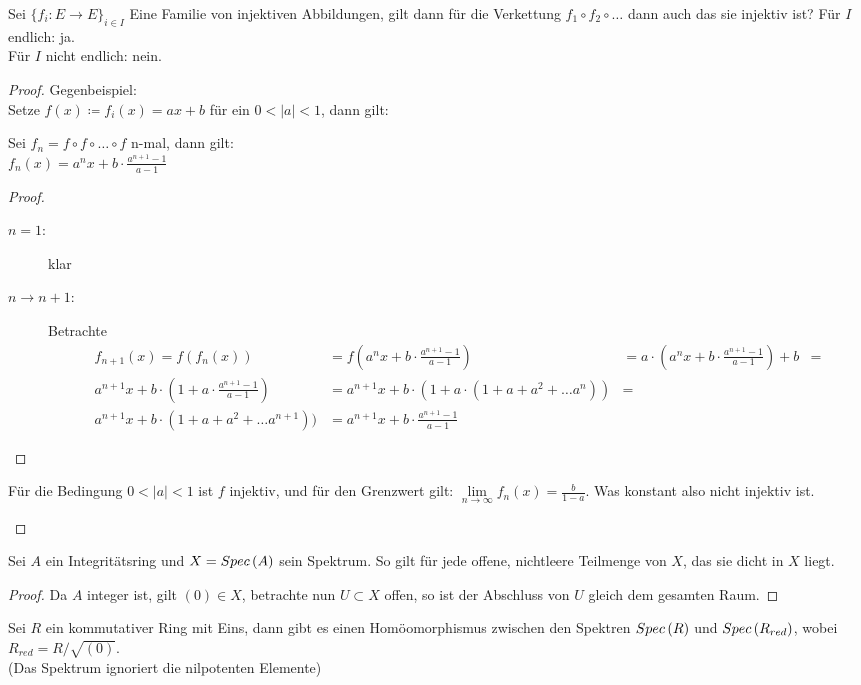 \documentclass[ngerman, parskip=half, titlepage=false]{scrartcl}
\begin{document}
\begin{Auf}
  Sei $\{ f_i : E \rightarrow E \}_{i \in I}$ Eine Familie von
  injektiven Abbildungen, gilt dann für die Verkettung
  $ f_1 \circ f_2 \circ \ldots$ dann auch das sie injektiv ist?
  Für $I$ endlich: ja.\\
  Für $I$ nicht endlich: nein.
  \begin{proof}
    Gegenbeispiel:\\ Setze $f(x) \coloneqq f_i (x) = ax+b$ für ein
    $0 < |a| < 1$, dann gilt:
    \begin{Beh}
      Sei $f_n = f \circ f \circ \ldots \circ f$ n-mal, dann gilt:\\
      $f_n(x) = a^n x + b \cdot \frac{a^{n+1} -1}{a-1}$
      \begin{proof}
        \begin{description}
        \item[$n=1$:] klar
        \item[$n \rightarrow n+1$:] Betrachte\\
          \begin{align*}
            f_{n+1}(x) = f(f_n(x)) 
          &= 
            f(a^n x + b \cdot \frac{a^{n+1}-1}{a-1}) 
          &= 
            a \cdot \left( a^n x + b \cdot \frac{a^{n+1}-1}{a-1} \right) + b        
          &= \\
            a^{n+1} x + b \cdot ( 1 + a \cdot \frac{a^{n+1}-1}{a-1})
          &= 
            a^{n+1} x + b \cdot (1 + a \cdot (1 + a + a^2 + \ldots a^{n}))
          &= \\
            a^{n+1} x + b \cdot (1  + a + a^2 + \ldots a^{n+1}))
          &= 
            a^{n+1} x + b \cdot \frac{a^{n+1}-1}{a-1}
          \end{align*}
        \end{description}
        \end{proof}
        Für die Bedingung $0 < |a| < 1$ ist $f$ injektiv, und für den
        Grenzwert gilt: $\lim\limits_{n \rightarrow \infty} f_n(x) = \frac{b}{1-a}$.
        Was konstant also nicht injektiv ist.
    \end{Beh}
  \end{proof}
\end{Auf}

\begin{Beh}
  Sei $A$ ein Integritätsring und $X = Spec \left( A \right)$ sein Spektrum. So gilt für jede
  offene, nichtleere Teilmenge von $X$, das sie dicht in $X$ liegt.
  \begin{proof}
    Da $A$ integer ist, gilt $(0) \in X$, betrachte nun $U \subset X$ offen, so 
    ist der Abschluss von $U$ gleich dem gesamten Raum.
  \end{proof}
\end{Beh}

\begin{Satz}
  Sei $R$ ein kommutativer Ring mit Eins, dann gibt es einen
  Homöomorphismus zwischen den Spektren $Spec \left( R \right)$ und
  $Spec \left( R_{red} \right)$, wobei $R_{red}=R/\sqrt{(0)}$.\\
  (Das Spektrum ignoriert die nilpotenten Elemente)
\end{Satz}
\end{document}
